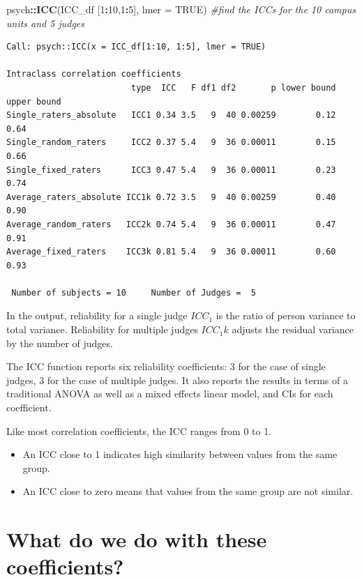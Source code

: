 \documentclass[
  english,
]{book}
\newenvironment{Shaded}{\begin{snugshade}}{\end{snugshade}}
\newcommand{\CommentTok}[1]{\textcolor[rgb]{0.56,0.35,0.01}{\textit{#1}}}
\newcommand{\DataTypeTok}[1]{\textcolor[rgb]{0.13,0.29,0.53}{#1}}
\newcommand{\DecValTok}[1]{\textcolor[rgb]{0.00,0.00,0.81}{#1}}
\newcommand{\KeywordTok}[1]{\textcolor[rgb]{0.13,0.29,0.53}{\textbf{#1}}}
\newcommand{\NormalTok}[1]{#1}
\newcommand{\OperatorTok}[1]{\textcolor[rgb]{0.81,0.36,0.00}{\textbf{#1}}}
\newcommand{\OtherTok}[1]{\textcolor[rgb]{0.56,0.35,0.01}{#1}}
\providecommand{\tightlist}{%
  \setlength{\itemsep}{0pt}\setlength{\parskip}{0pt}}
\begin{document}
\begin{Shaded}
\begin{Highlighting}[]
\NormalTok{psych}\OperatorTok{::}\KeywordTok{ICC}\NormalTok{(ICC_df [}\DecValTok{1}\OperatorTok{:}\DecValTok{10}\NormalTok{,}\DecValTok{1}\OperatorTok{:}\DecValTok{5}\NormalTok{], }\DataTypeTok{lmer =} \OtherTok{TRUE}\NormalTok{) }\CommentTok{#find the ICCs for the 10 campus units and 5 judges}
\end{Highlighting}
\end{Shaded}

\begin{verbatim}
Call: psych::ICC(x = ICC_df[1:10, 1:5], lmer = TRUE)

Intraclass correlation coefficients 
                         type  ICC   F df1 df2       p lower bound upper bound
Single_raters_absolute   ICC1 0.34 3.5   9  40 0.00259        0.12        0.64
Single_random_raters     ICC2 0.37 5.4   9  36 0.00011        0.15        0.66
Single_fixed_raters      ICC3 0.47 5.4   9  36 0.00011        0.23        0.74
Average_raters_absolute ICC1k 0.72 3.5   9  40 0.00259        0.40        0.90
Average_random_raters   ICC2k 0.74 5.4   9  36 0.00011        0.47        0.91
Average_fixed_raters    ICC3k 0.81 5.4   9  36 0.00011        0.60        0.93

 Number of subjects = 10     Number of Judges =  5
\end{verbatim}

In the output, reliability for a single judge \(ICC_1\) is the ratio of person variance to total variance. Reliability for multiple judges \(ICC_1k\) adjusts the residual variance by the number of judges.

The ICC function reports six reliability coefficients: 3 for the case of single judges, 3 for the case of multiple judges. It also reports the results in terms of a traditional ANOVA as well as a mixed effects linear model, and CIs for each coefficient.

Like most correlation coefficients, the ICC ranges from 0 to 1.

\begin{itemize}
\tightlist
\item
  An ICC close to 1 indicates high similarity between values from the same group.
\item
  An ICC close to zero means that values from the same group are not similar.
\end{itemize}

\hypertarget{what-do-we-do-with-these-coefficients}{%
\section{What do we do with these coefficients?}\label{what-do-we-do-with-these-coefficients}}
\end{document}
